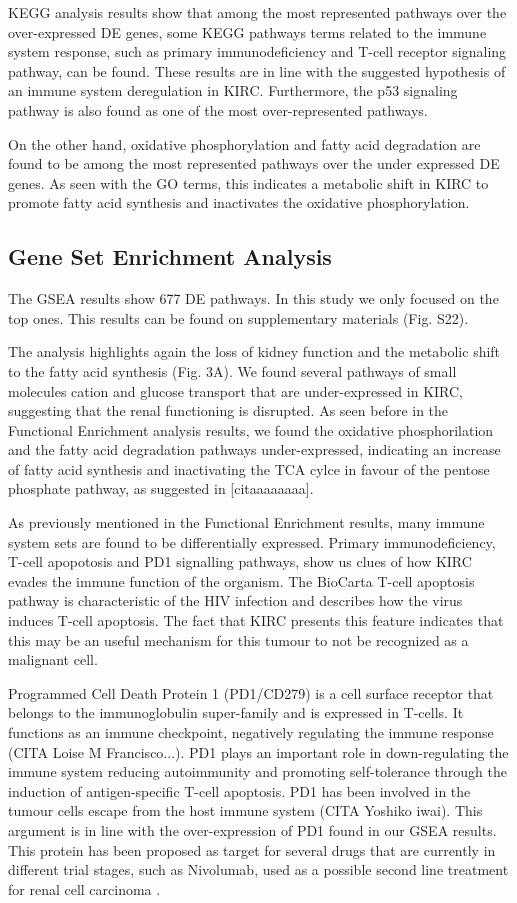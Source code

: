 \documentclass[9pt,twocolumn,twoside]{gsajnl}
\begin{document}
KEGG analysis results show that among the most represented pathways over the over-expressed DE genes, some KEGG pathways terms related to the immune system response, such as primary immunodeficiency and T-cell receptor signaling pathway, can be found.  These results are in line with the suggested hypothesis of an immune system deregulation in KIRC. Furthermore, the p53 signaling pathway is also found as one of the most over-represented pathways.

On the other hand, oxidative phosphorylation and fatty acid degradation are found to be among the most represented pathways over the under expressed DE genes. As seen with the GO terms, this indicates a metabolic shift in KIRC to promote fatty acid synthesis and inactivates the oxidative phosphorylation.

\subsection*{Gene Set Enrichment Analysis}
The GSEA results show 677 DE pathways. In this study we only focused on the top ones. This results can be found on supplementary materials (Fig. S22).


The analysis highlights again the loss of kidney function and the metabolic shift to the fatty acid synthesis  (Fig. 3A). We found several pathways of small molecules cation and glucose transport that are under-expressed in KIRC, suggesting that the renal functioning is disrupted. As seen before in the Functional Enrichment analysis results, we found the oxidative phosphorilation and the fatty acid degradation pathways under-expressed, indicating an increase of fatty acid synthesis and inactivating the TCA cylce in favour of the pentose phosphate pathway, as suggested in [citaaaaaaaa]. 

As previously mentioned in the Functional Enrichment results, many immune system sets are found to be differentially expressed. Primary immunodeficiency, T-cell apopotosis and PD1 signalling pathways, show us clues of how KIRC evades the immune function of the organism. The BioCarta T-cell apoptosis pathway is characteristic of the HIV infection and describes how the virus induces T-cell apoptosis. The fact that KIRC presents this feature indicates that this may be an useful mechanism for this tumour to not be recognized as a malignant cell.

Programmed Cell Death Protein 1 (PD1/CD279) is a cell surface receptor that belongs to the immunoglobulin super-family and is expressed in T-cells. It functions as an immune checkpoint, negatively regulating the immune response (CITA Loise M Francisco...). PD1 plays an important role in down-regulating the immune system reducing autoimmunity and promoting self-tolerance through the induction of antigen-specific T-cell apoptosis.
PD1 has been involved in the tumour cells escape from the host immune system (CITA Yoshiko iwai). This argument is in line with the over-expression of PD1 found in our GSEA results. This protein has been proposed as target for several drugs that are currently in different trial stages, such as Nivolumab, used as a possible second line treatment for renal cell carcinoma \cite{nivolumab}.
\end{document}
